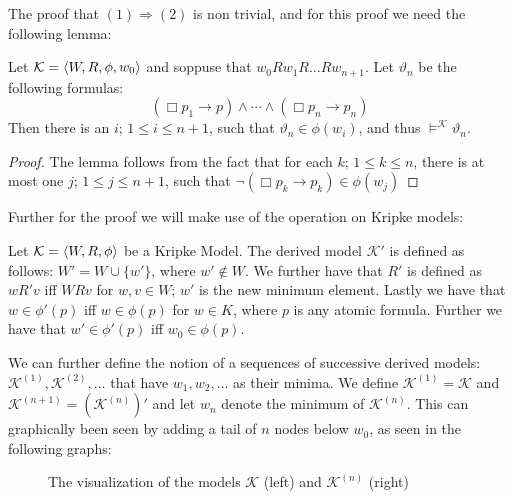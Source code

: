 \documentclass[../main.tex]{subfiles}
\begin{document}
	The proof that $(1)\Rightarrow(2)$ is non trivial, and for this proof
	we need the following lemma:
	\begin{lem}
		\label{lem:hvad}
		Let $\mathcal{K}=\langle W,R,\phi,w_0\rangle$ and soppuse that
		$w_0Rw_1R\ldots Rw_{n+1}$. Let $\vartheta_n$ be the following
		formulas:
		\[(\Box p_1\rightarrow p)\wedge\cdots\wedge(\Box p_n\rightarrow
		p_n)\]
		Then there is an $i$; $1\leq i\leq n+1$, such that
		$\vartheta_n\in\phi(w_i)$, and thus
		$\vDash^\mathcal{K}\vartheta_n$.
	\end{lem}
	\begin{proof}
		The lemma follows from the fact that for each $k$; $1\leq k\leq
		n$, there is at most one $j$; $1\leq j\leq n+1$, such that
		$\neg(\Box p_k\rightarrow p_k)\in\phi(w_j)$
	\end{proof}
Further for the proof we will make use of the operation on Kripke models:
\begin{defi}
	Let $\mathcal{K}=\langle W,R,\phi\rangle$ be a Kripke Model. The derived model
	$\mathcal{K'}$ is defined as follows: $W'=W\cup \{w'\}$, where
	$w'\not\in W$. We further have that $R'$ is defined as $wR'v$ iff $WRv$
	for $w,v\in W$; $w'$ is the new minimum element. Lastly we have that
	$w\in\phi'(p)$ iff $w\in\phi(p)$ for $w\in K$, where $p$ is any atomic
	formula. Further we have that $w'\in\phi'(p)$ iff $w_0\in\phi(p)$.
\end{defi}
We can further define the notion of a sequences of successive derived models:
$\mathcal{K}^{(1)},\mathcal{K}^{(2)},\ldots$ that have $w_1,w_2,\ldots$ as
their minima. We define $\mathcal{K}^{(1)}=\mathcal{K}$ and
$\mathcal{K}^{(n+1)}=(\mathcal{K}^{(n)})'$ and let $w_n$ denote the minimum of
$\mathcal{K}^{(n)}$. This can graphically been seen by adding a tail of $n$
nodes below $w_0$, as seen in the following graphs:


\begin{figure}[h]
	\begin{center}
\qquad
\qquad
{}
\end{center}
\caption{The visualization of the models $\mathcal{K}$ (left) and
$\mathcal{K}^{(n)}$ (right)}
\end{figure}
\end{document}
